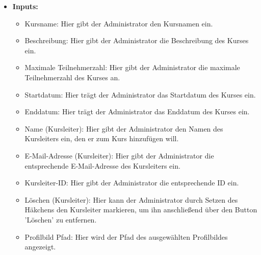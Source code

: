 \begin{itemize}
				
			\item \textbf{Inputs:}
				\begin{itemize}
					\item Kursname: Hier gibt der Administrator den Kursnamen ein.
					\item Beschreibung: Hier gibt der Administrator die Beschreibung des Kurses ein.
					\item Maximale Teilnehmerzahl: Hier gibt der Administrator die maximale Teilnehmerzahl des Kurses an.
					\item Startdatum: Hier trägt der Administrator das Startdatum des Kurses ein.
					\item Enddatum: Hier trägt der Administrator das Enddatum des Kurses ein.
					\item Name (Kursleiter): Hier gibt der Administrator den Namen des Kursleiters ein, den er zum Kurs hinzufügen will.
					\item E-Mail-Adresse (Kursleiter): Hier gibt der Administrator die entsprechende E-Mail-Adresse des Kursleiters ein.
					\item Kursleiter-ID: Hier gibt der Administrator die entsprechende ID ein.
					\item Löschen (Kursleiter): Hier kann der Administrator durch Setzen des Häkchens den Kursleiter markieren, um ihn anschließend über den Button 'Löschen' zu entfernen.
					\item Profilbild Pfad: Hier wird der Pfad des ausgewählten Profilbildes angezeigt.
					
				\end{itemize}
				
				\begin{center}
					\begin{longtable}{|p{3cm} |p{5cm} | p{4cm}|p{3cm}|}
						

\end{longtable}
\end{center}
\end{itemize}
